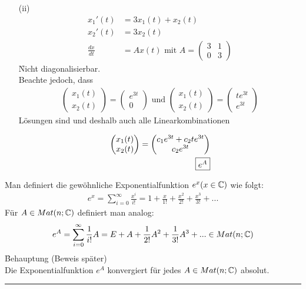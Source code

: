 \begin{itemize}
\item[(ii)]
\begin{align}
x_1' (t) &= 3 x_1 (t) + x_2 (t) \\
x_2' (t) &= 3 x_2 (t) \\
\frac{dx}{dt} &= Ax(t) \text{ mit } A = \begin{pmatrix} 3 & 1 \\ 0 & 3 \end{pmatrix}
\end{align}
\f{Nicht diagonalisierbar.} \\
Beachte jedoch, dass
\begin{align}
\begin{pmatrix} x_1(t) \\ x_2(t) \end{pmatrix} = \begin{pmatrix} e^{3t} \\ 0 \end{pmatrix} \text{ und } \begin{pmatrix} x_1(t) \\ x_2(t) \end{pmatrix} = \begin{pmatrix} t e^{3t} \\ e^{3t} \end{pmatrix}
\end{align}
Lösungen sind und deshalb auch alle Linearkombinationen

\begin{align}
\begin{pmatrix} x_1(t) \\ x_2(t) \end{pmatrix} = \begin{pmatrix} c_1 e^{3t} + c_2 t e^{3t} \\ c_2 e^{3t}\end{pmatrix} \\
\fbox{$e^A$}
\end{align}
\end{itemize}
Man definiert die gewöhnliche Exponentialfunktion $e^x (x \in \mathbb{C})$ wie folgt:
\begin{align}
e^x = \sum_{i=0}^{\infty} \frac{x^i}{i!} = 1 + \frac{x}{1!} + \frac{x^2}{2!} + \frac{x^3}{3!} + ...
\end{align}
Für $A \in Mat(n; \mathbb{C})$ definiert man analog:
\begin{align}
e^A = \sum_{i=0}^{\infty} \frac{1}{i!} A = E + A + \frac{1}{2!}A^2 + \frac{1}{3!} A^3 + ... \in Mat(n;\mathbb{C})
\end{align}
\f{Behauptung} (Beweis später) \\
Die Exponentialfunktion $e^A$ konvergiert für jedes $A \in Mat(n; \mathbb{C})$ absolut.
\vspace*{0.2cm} \\ \rule{\linewidth}{0.3mm}\vspace*{0.1cm}

